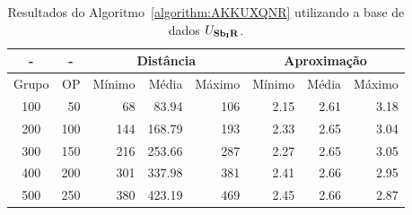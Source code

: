 \begin{table}[!htb]
  \caption{Resultados do Algoritmo~\ref{algorithm:AKKUXQNR} utilizando a base de dados $U_{\textbf{Sb\textsubscript{I}R}}{}$.}
  \label{table:PSYFOCXO}
  \centering
  \begin{tabular}{|c|r|r|r|r|r|r|r|}
    \hline
      -      & \multicolumn{1}{c|}{-} & \multicolumn{3}{c|}{Distância}             & \multicolumn{3}{c|}{Aproximação}           \\ \hline
    Grupo    & OP                     & Mínimo       & Média        & Máximo       & Mínimo       & Média        & Máximo       \\ \hline  
    100      & 50                     & 68           & 83.94        & 106          & 2.15         & 2.61         & 3.18         \\ \hline
    200      & 100                    & 144          & 168.79       & 193          & 2.33         & 2.65         & 3.04         \\ \hline
    300      & 150                    & 216          & 253.66       & 287          & 2.27         & 2.65         & 3.05         \\ \hline
    400      & 200                    & 301          & 337.98       & 381          & 2.41         & 2.66         & 2.95         \\ \hline
    500      & 250                    & 380          & 423.19       & 469          & 2.45         & 2.66         & 2.87         \\ \hline    
  \end{tabular}
\end{table}